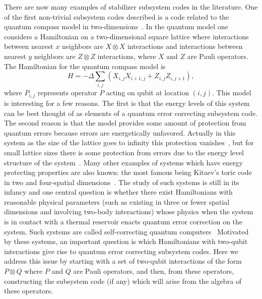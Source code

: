 \documentclass[twocolumn,showpacs,preprintnumbers,amsmath,amssymb,nofootinbib,pra,floatfix]{revtex4-1}
\begin{document}
There are now many examples of stabilizer subsystem codes in the literature.  One of the first non-trivial subsystem codes described is a code related to the quantum compass model in two-dimensions~\cite{Bacon:01a,Dorier:05a,Bacon:06a}.  In the quantum model one considers a Hamiltonian on a two-dimensional square lattice where interactions between nearest $x$ neighbors are $X \otimes X$ interactions and interactions between nearest $y$ neighbors are $Z \otimes Z$ interactions, where $X$ and $Z$ are Pauli operators.  The Hamiltonian for the quantum compass model is
\begin{equation}
H=-\Delta \sum_{i,j} (X_{i,j} X_{i+1,j} +Z_{i,j} Z_{i,j+1}),
\end{equation}
where $P_{i,j}$ represents operator $P$ acting on qubit at location $(i,j)$.  This model is interesting for a few reasons.  The first is that the energy levels of this system can be best thought of as elements of a quantum error correcting subsystem code.  The second reason is that the model provides some amount of protection from quantum errors because errors are energetically unfavored.  Actually in this system as the size of the lattice goes to infinity this protection vanishes~\cite{Dorier:05a}, but for small lattice sizes there is some protection from errors due to the energy level structure of the system~\cite{Bacon:01a}.  Many other examples of systems which have energy protecting properties are also known: the most famous being Kitaev's toric code in two and four-spatial dimensions~\cite{Kitaev:97c,Kitaev:03a,Dennis:02a}.  The study of such systems is still in its infancy and one central question is whether there exist Hamiltonians with reasonable physical parameters (such as existing in three or fewer spatial dimensions and involving two-body interactions) whose physics when the system is in contact with a thermal reservoir enacts quantum error correction on the system.  Such systems are called self-correcting quantum computers~\cite{Bacon:06a,Bombin:09a}  Motivated by these systems, an important question is which Hamiltonians with two-qubit interactions give rise to quantum error correcting subsystem codes.  Here we address this issue by starting with a set of two-qubit interactions of the form $P\otimes Q$ where $P$ and $Q$ are Pauli operators, and then, from these operators, constructing the subsystem code (if any) which will arise from the algebra of these operators.
\end{document}

